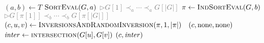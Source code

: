 \documentclass{article}
\begin{document}
\begin{algorithm}
\begin{algorithmic}[1]
\State $(a,b) \gets T$
\State $\textsc{SortEval}(G,a)$ 
\hfill {\small \textcolor{gray}{$\rhd G[1] \prec_a \cdots \prec_a G[|G|]$ }}
\State $\pi \gets \textsc{IndSortEval}(G,b)$ 
\hfill {\small \textcolor{gray}{$\rhd G[\pi[1]] \prec_b \cdots \prec_b G[\pi[|G|]]$ }}
\State $(c,u,v) \gets \textsc{InversionsAndRandomInversion}(\pi, 1,|\pi|)$
\ \Return $(c,\mathrm{none},\mathrm{none})$ \EndIf 
\State $\mathit{inter} \gets \textsc{intersection}(G[u],G[v])$
\State \Return $(c, \mathit{inter})$
\end{algorithmic}
\caption{\IntersectionsAndRandomIntersection$(G,a,b)$}
\label{intersection_and_random_intersection_algorithm}
\end{algorithm}
\end{document}
